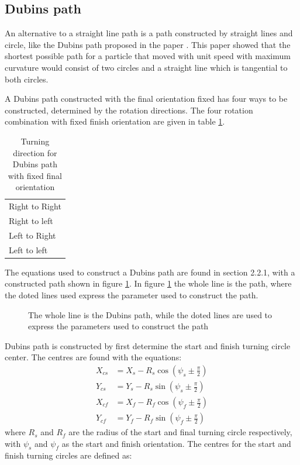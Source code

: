 \subsection{Dubins path}\label{S:DubinsPath}
An alternative to a straight line path is a path constructed by straight lines and circle, like the Dubins path proposed in the paper \citep{dubins1957curves}. This paper showed that the shortest possible path for a particle that moved with unit speed with maximum curvature would consist of two circles and a straight line which is tangential to both circles.

A Dubins path constructed with the final orientation fixed has four ways to be constructed, determined by the rotation directions. The four rotation combination with fixed finish orientation are given in table \ref{Tb:DubinsTurningDirection}.
\begin{table}[H]
\centering
\begin{adjustbox}{max width=\textwidth}
\begin{tabular}{ | l |}
\hline
Right to Right \\
Right to left \\
Left to Right \\
Left to left \\ \hline
\end{tabular}
\end{adjustbox}
\caption{Turning direction for Dubins path with fixed final orientation}
\label{Tb:DubinsTurningDirection}
\end{table}
The equations used to construct a Dubins path are found in \citep{tsourdos2010cooperative} section 2.2.1, with a constructed path shown in figure \ref{Fig:DubinsPath}. In figure \ref{Fig:DubinsPath} the whole line is the path, where the doted lines used express the parameter used to construct the path.
\begin{figure}[H]
\def\svgwidth{\textwidth} %

\caption{The whole line is the Dubins path, while the doted lines are used to express the parameters used to construct the path}
\label{Fig:DubinsPath}
\end{figure}
Dubins path is constructed by first determine the start and finish turning circle center. The centres are found with the equations:
\begin{subequations}
\begin{align}
X_{cs} &= X_s - R_s\cos(\psi_s \pm \frac{\pi}{2}) \\
Y_{cs} &= Y_s - R_s\sin(\psi_s \pm \frac{\pi}{2}) \\
X_{cf} &= X_f - R_f\cos(\psi_f \pm \frac{\pi}{2}) \\
Y_{cf} &= Y_f - R_f\sin(\psi_f \pm \frac{\pi}{2})
\end{align}
\end{subequations}
where $R_s$ and $R_f$ are the radius of the start and final turning circle respectively, with $\psi_s$ and $\psi_f$ as the start and finish orientation. The centres for the start and finish turning circles are defined as:

